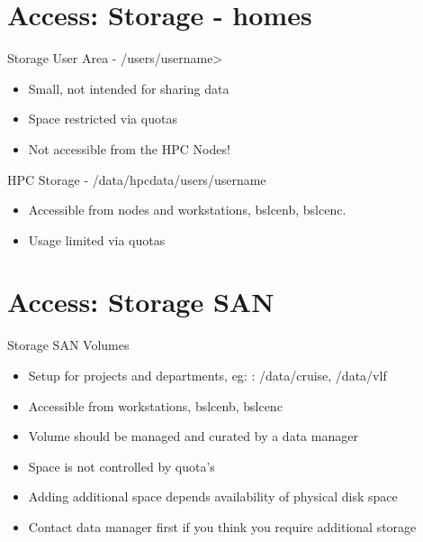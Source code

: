 {
\section{Access: Storage - homes}
%
\begin{frame}{Storage}
\text User Area - /users/\<username>\
\begin{itemize}
\item Small, not intended for sharing data
\item Space restricted via quotas
\item Not accessible from the HPC Nodes!
\end{itemize}
\text HPC Storage - /data/hpcdata/users/username
\begin{itemize}
\item Accessible from nodes and workstations, bslcenb, bslcenc.
\item Usage limited via quotas
\end{itemize}
\end{frame}
}

{
\section{Access: Storage SAN}
%
\begin{frame}{Storage SAN Volumes}
\begin{itemize}
\item Setup for projects and departments, eg: : /data/cruise, /data/vlf
\item Accessible from workstations, bslcenb, bslcenc
\item Volume should be managed and curated by a data manager
\item Space is not controlled by quota's
\item Adding additional space depends availability of physical disk space
\item Contact data manager first if you think you require additional storage
\end{itemize}
\end{frame}
}

